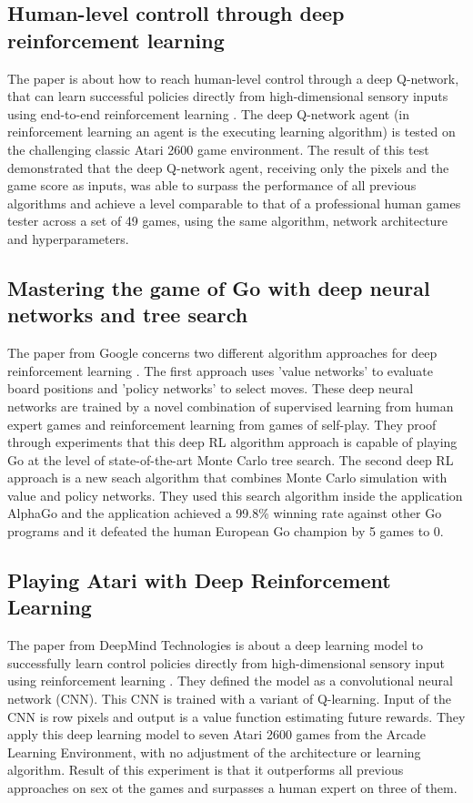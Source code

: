 \documentclass[conference]{IEEEtran}
\begin{document}
\subsection{Human-level controll through deep reinforcement learning}
The paper is about how to reach human-level control through a deep Q-network, that can learn successful policies directly from high-dimensional sensory inputs using end-to-end reinforcement learning \cite{DRL:HumanLevelControl}. The deep Q-network agent (in reinforcement learning an agent is the executing learning algorithm) is tested on the challenging classic Atari 2600 game environment. The result of this test demonstrated that the deep Q-network agent, receiving only the pixels and the game score as inputs, was able to surpass the performance of all previous algorithms and achieve a level comparable to that of a professional human games tester across a set of 49 games, using the same algorithm, network architecture and hyperparameters. 


\subsection{Mastering the game of Go with deep neural networks and tree search}

The paper from Google concerns two different algorithm approaches for deep reinforcement learning \cite{DRL:Silver_2016}. The first approach uses 'value networks' to evaluate board positions and 'policy networks' to select moves. These deep neural networks are trained by a novel combination of supervised learning from human expert games and reinforcement learning from games of self-play. They proof through experiments that this deep RL algorithm approach is capable of playing Go at the level of state-of-the-art Monte Carlo tree search. The second deep RL approach is a new seach algorithm that combines Monte Carlo simulation with value and policy networks. They used this search algorithm inside the application AlphaGo and the application achieved a 99.8\% winning rate against other Go programs and it defeated the human European Go champion by 5 games to 0.

\subsection{Playing Atari with Deep Reinforcement Learning}
The paper from DeepMind Technologies is about a deep learning model to successfully learn control policies directly from high-dimensional sensory input using reinforcement learning \cite{mnih-atari-2013}. They defined the model as a convolutional neural network (CNN). This CNN is trained with a variant of Q-learning. Input of the CNN is row pixels and output is a value function estimating future rewards. They apply this deep learning model to seven Atari 2600 games from the Arcade Learning Environment, with no adjustment of the architecture or learning algorithm. Result of this experiment is that it outperforms all previous approaches on sex ot the games and surpasses a human expert on three of them. 
\end{document}
